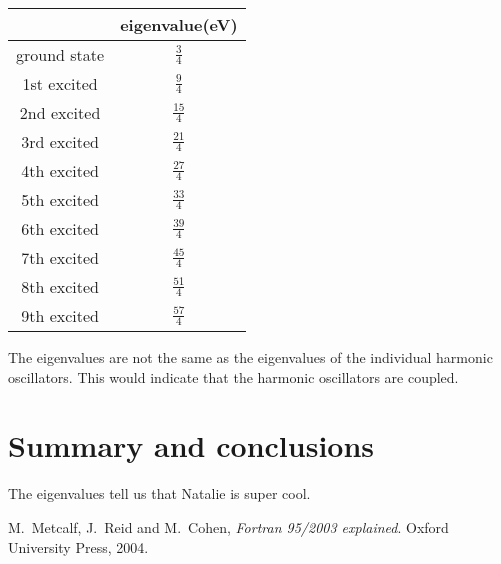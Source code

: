 \documentclass[12pt]{article}
\begin{document}
\begin{table}[h]
\centering
\begin{tabular}{cc}
\hline
             & eigenvalue(eV) \\ \hline\hline  
ground state & {$\frac{3}{4}$}         \\ [1ex]
1st excited  & {$\frac{9}{4}$}        \\ [1ex]
2nd excited  & {$\frac{15}{4}$}         \\ [1ex]
3rd excited  & {$\frac{21}{4}$}         \\ [1ex]
4th excited  & {$\frac{27}{4}$}        \\ [1ex]
5th excited  & {$\frac{33}{4}$}         \\ [1ex]
6th excited  & {$\frac{39}{4}$}         \\ [1ex]
7th excited  & {$\frac{45}{4}$}        \\ [1ex]
8th excited  & {$\frac{51}{4}$}        \\ [1ex]
9th excited  & {$\frac{57}{4}$}       \\  \hline
\end{tabular}
\end{table}

The eigenvalues are not the same as the eigenvalues of the individual harmonic oscillators. This would indicate that the harmonic oscillators are coupled.  


\section{Summary and conclusions}

The eigenvalues tell us that Natalie is super cool. 

\begin{thebibliography}{}


 M.\ Metcalf, J.\ Reid and M.\ Cohen, {\it Fortran 95/2003 explained}. Oxford University Press, 2004.
 

\end{thebibliography}
\end{document}
